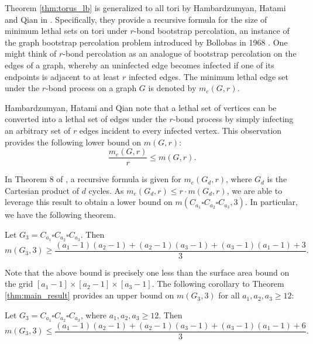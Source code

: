 Theorem \ref{thm:torus_lb} is generalized to all tori by Hambardzumyan, Hatami and Qian in \cite{hambardzumyan:2020}. Specifically, they provide a recursive formula for the size of minimum lethal sets on tori under $r$-bond bootstrap percolation, an instance of the graph bootstrap percolation problem introduced by Bollobas in 1968 \cite{bollobas1968weakly}. One might think of $r$-bond percolation as an analogue of bootstrap percolation on the edges of a graph, whereby an uninfected edge becomes infected if one of its endpoints is adjacent to at least $r$ infected edges. The minimum lethal edge set under the $r$-bond process on a graph $G$ is denoted by $m_e(G,r)$. 

Hambardzumyan, Hatami and Qian note that a lethal set of vertices can be converted into a lethal set of edges under the $r$-bond process by simply infecting an arbitrary set of $r$ edges incident to every infected vertex. This observation provides the following lower bound on $m(G,r)$:
$$\frac{m_e(G,r)}{r} \leq m(G,r).$$

In Theorem 8 of \cite{hambardzumyan:2020}, a recursive formula is given for $m_e(G_d,r)$, where $G_d$ is the Cartesian product of $d$ cycles. As $m_e(G_d,r) \leq r \cdot m(G_d,r)$, we are able to leverage this result to obtain a lower bound on $m(C_{a_1} \square C_{a_2} \square C_{a_3}, 3)$. In particular, we have the following theorem.

\begin{thm}
\label{thm:3d_torus_lb}
Let $G_3 = C_{a_1} \square C_{a_2} \square C_{a_3}$. Then
$$m(G_3,3) \geq \frac{(a_1-1)(a_2-1) + (a_2-1)(a_3-1) + (a_3-1)(a_1 -1) + 3}{3}.$$
\end{thm}

\noindent Note that the above bound is precisely one less than the surface area bound on the grid $[a_1-1] \times [a_2-1] \times [a_3-1]$. The following corollary to Theorem \ref{thm:main_result} provides an upper bound on $m(G_3,3)$ for all $a_1,a_2,a_3 \geq 12$:

\begin{cor}
Let $G_3 = C_{a_1} \square C_{a_2} \square C_{a_3}$, where $a_1,a_2,a_3 \geq 12$. Then
$$m(G_3,3) \leq \frac{(a_1-1)(a_2-1) + (a_2-1)(a_3-1) + (a_3-1)(a_1 -1) + 6}{3}.$$
\end{cor}


